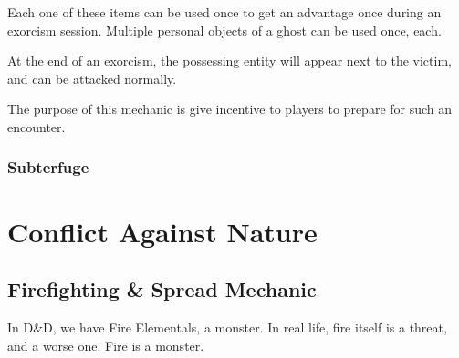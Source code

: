\documentclass[twocolumn]{dndbook}
\begin{document}
Each one of these items can be used once to get an advantage once during an exorcism session.
Multiple personal objects of a ghost can be used once, each.

At the end of an exorcism, the possessing entity will appear next to the victim, and can be attacked normally.\par

The purpose of this mechanic is give incentive to players to prepare for such an encounter.\par


\subsection{Subterfuge}


\chapter{Conflict Against Nature}
\section{Firefighting \& Spread Mechanic}

In D\&D, we have Fire Elementals, a monster.
In real life, fire itself is a threat, and a worse one.
Fire is a monster.\par
\end{document}
